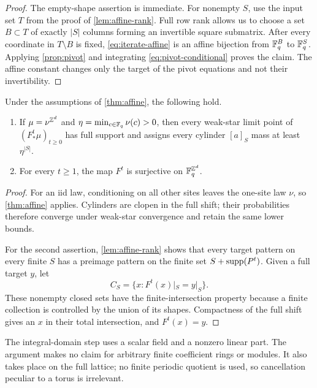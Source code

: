 \begin{proof}
The empty-shape assertion is immediate.  For nonempty $S$, use the input set
$T$ from the proof of \cref{lem:affine-rank}.  Full row rank allows us to
choose a set $B\subset T$ of exactly $|S|$ columns forming an invertible
square submatrix.  After every coordinate in $T\setminus B$ is fixed,
\eqref{eq:iterate-affine} is an affine bijection from $\mathbb{F}_q^B$ to
$\mathbb{F}_q^S$.  Applying \cref{prop:pivot} and integrating
\eqref{eq:pivot-conditional} proves the claim.  The affine constant changes
only the target of the pivot equations and not their invertibility.
\end{proof}

\begin{corollary}\label{cor:affine-consequences}
Under the assumptions of \cref{thm:affine}, the following hold.
\begin{enumerate}[label=\textup{(\alph*)}]
  \item If $\mu=\nu^{\mathbb{Z}^d}$ and
  $\eta=\min_{c\in\mathbb{F}_q}\nu(c)>0$, then every weak-star limit point of
  $(F^t_*\mu)_{t\geq0}$ has full support and assigns every cylinder
  $[a]_S$ mass at least $\eta^{|S|}$.
  \item For every $t\geq1$, the map $F^t$ is surjective on
  $\mathbb{F}_q^{\mathbb{Z}^d}$.
\end{enumerate}
\end{corollary}

\begin{proof}
For an iid law, conditioning on all other sites leaves the one-site law
$\nu$, so \cref{thm:affine} applies.  Cylinders are clopen in the full shift;
their probabilities therefore converge under weak-star convergence and
retain the same lower bounds.

For the second assertion, \cref{lem:affine-rank} shows that every target
pattern on every finite $S$ has a preimage pattern on the finite set
$S+\operatorname{supp}(P^t)$.  Given a full target $y$, let
\[
  C_S=\{x:F^t(x)|_S=y|_S\}.
\]
These nonempty closed sets have the finite-intersection property because a
finite collection is controlled by the union of its shapes.  Compactness of
the full shift gives an $x$ in their total intersection, and $F^t(x)=y$.
\end{proof}

\begin{remark}\label{rem:affine-scope}
The integral-domain step uses a scalar field and a nonzero linear part.  The
argument makes no claim for arbitrary finite coefficient rings or modules.
It also takes place on the full lattice; no finite periodic quotient is used,
so cancellation peculiar to a torus is irrelevant.
\end{remark}

